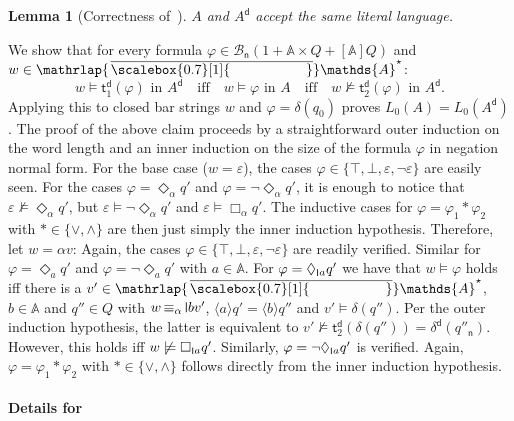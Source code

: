 \documentclass[10pt,a4paper]{amsart}
\newtheorem{lem}[theo]{Lemma}
\theoremstyle{definition}
\newcommand{\At}{\mathds{A}}
\newcommand{\barAs}{\barNames^{\star}}
\newcommand{\trans}{\mathsf{t}}
\newcommand{\allbool}{\mathcal{B}}
\newcommand{\negsym}{\mathsf{n}}
\newcommand{\negstate}[1]{#1_{\negsym}}
\newcommand{\negbool}{\allbool_{\negsym}}
\newcommand{\dual}[1]{{#1}^\mathsf{d}}
\newcommand{\names}{\At}
\newcommand{\Abstr}[2][\names]{[#1]#2}
\newcommand{\braket}[1]{\langle #1 \rangle}
\renewcommand{\phi}{\varphi}
\newcommand{\set}[1]{\{#1\}}
\DeclareMathOperator{\alphaequiv}{\equiv_{\alpha}}
\newcommand{\mybar}[3]{%
  \mathrlap{\hspace{#2}\overline{\scalebox{#1}[1]{\phantom{\ensuremath{#3}}}}}\ensuremath{#3}
}
\newcommand{\barNames}{{\mybar{0.7}{1.25pt}{\names}}}
\renewcommand{\vDash}{\models}
\newcommand{\midmid}{\hspace{0.2ex}{\rule[-0.1ex]{0.6pt}{1.65ex}}\hspace{0.2ex}}
\newcommand{\scriptmidmid}{\hspace{0.2ex}{\rule[-0.1ex]{0.6pt}{1.1ex}}\hspace{0.2ex}}
\newcommand{\newletter}[1]{{\midmid}#1}
\newcommand{\scriptnew}[1]{{\scriptmidmid}#1}
\begin{document}
\begin{lem}[Correctness of~]\label{lem:exprNegStates}
$A$ and $\dual{A}$ accept the same literal language.
\end{lem}
\begin{IEEEproof}
  We show that for every formula $\varphi \in \negbool(1 + \names \times Q + \Abstr{Q})$ and $w\in \barAs$:
\begin{equation}\label{eq:claim-ad} w \vDash \dual{\trans}_1(\varphi) \text{ in~$\dual{A}$} \quad\text{iff}\quad w \vDash \varphi \text{ in~$A$} \quad\text{iff}\quad w \not\vDash \dual{\trans}_2(\varphi) \text{  in~$\dual{A}$}.\end{equation}
Applying this to closed bar strings $w$ and $\phi=\delta(q_0)$ proves $L_0(A)=L_0(\dual{A})$. The proof of the above claim
  proceeds by a straightforward outer induction on the word length and an inner induction on the size of the formula $\phi$ in negation normal form.
  For the base case ($w = \varepsilon$), the cases $\varphi \in \set{\top, \bot, \varepsilon, \neg\varepsilon}$ are
  easily seen. For the cases $\varphi = \Diamond_\alpha q'$ and $\varphi = \neg\Diamond_\alpha q'$, it is enough to
  notice that $\varepsilon \not\vDash \Diamond_\alpha q'$, but $\varepsilon \vDash \neg\Diamond_\alpha q'$ and
  $\varepsilon \vDash \Box_\alpha q'$. The inductive cases for $\varphi = \varphi_1 \ast \varphi_2$ with $\ast \in \set{\vee,\wedge}$ are then just simply the inner induction hypothesis.
  Therefore, let $w = \alpha v$: Again, the cases $\varphi \in \set{\top, \bot, \varepsilon, \neg\varepsilon}$ are
  readily verified. Similar for $\varphi = \Diamond_a q'$ and $\varphi = \neg\Diamond_a q'$ with $a \in \names$.
  For $\varphi = \Diamond_{\scriptnew{a}} q'$ we have that $w \vDash \varphi$ holds iff there is a $v' \in \barAs$,
  $b \in \names$ and $q'' \in Q$ with $w \alphaequiv \newletter{b}v'$, $\braket{a}q' = \braket{b}q''$ and
  $v' \vDash \delta(q'')$. Per the outer induction hypothesis, the latter is equivalent to $v' \not\vDash \dual{\trans}_2(\delta(q'')) = \dual{\delta}(\negstate{q''})$. However, this holds iff $w \not\vDash \Box_{\scriptnew{a}} q'$.
  Similarly, $\varphi = \neg\Diamond_{\scriptnew{a}} q'$ is verified. Again, $\varphi = \varphi_1 \ast\varphi_2$ with
  $\ast \in \set{\vee,\wedge}$ follows directly from the inner induction hypothesis.
\end{IEEEproof}

\paragraph*{Details for~}
\end{document}

